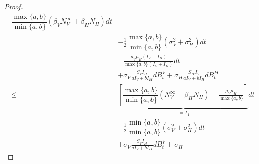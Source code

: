 \begin{proof}
\begin{equation}
\begin{aligned}
            \dfrac{
                \max\{
                    a, b
                \}
            }{
                \min\{
                    a, b
                \}
            }
            \left (
                 \beta_{V} N_V ^ \infty
                +
                \beta_H N_H
            \right ) dt
            \\
            & 
            -
            \frac{1}{2}
            \dfrac{
                \max\{
                    a, b
                \}
            }{
                \min\{
                    a, b
                \}
            }
            \left(
                \sigma_V ^ 2
                +
                \sigma_H ^ 2
            \right) dt
            \\
            &
            -
            \frac{
                \mu_V \mu_H (I_V + I_H)
            }{\max \{a, b\} (I_V + I_H)}
            dt
            \\
            & +
            \sigma_V 
            \frac{S_V I_H}{a I_V + b I_H}
            d B_t ^ V
            +
            \sigma_H
            \frac{S_H I_V}{a I_V + b I_H}
            d B_t ^ H
            \\
            \leq &
                \underbrace{
                    \left[
                        \dfrac{
                            \max\{a, b\}
                        }{
                            \min\{a, b\}
                        }
                        \left (
                             N_V ^ \infty
                            +
                            \beta_H N_H
                        \right )
                        -
                        \frac{
                            \mu_V \mu_H 
                        }{
                            \max \{a, b\} 
                        }
                     \right]
                }_{:= T_1}
                 dt
            \\
            &
            -
            \frac{1}{2}
                \dfrac{
                    \min\{
                        a, b
                    \}
                }{
                    \min\{
                        a, b
                    \}
                }
            \left (
                \sigma_V ^ 2
                +
                \sigma_H ^ 2
            \right ) dt
            \\
            & +
            \sigma_V 
            \frac{S_V I_H}{a I_V + b I_H}
            d B_t ^ V
            +
            \sigma_H

\end{aligned}
\end{equation}
\end{proof}
